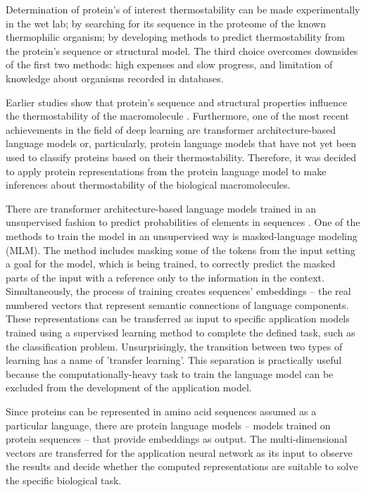 \documentclass[12pt]{article}
\begin{document}
	Determination of protein's of interest thermostability can be made 
	experimentally in the wet lab; by searching for its sequence in the 
	proteome of the known thermophilic organism; by developing methods to 
	predict thermostability from the protein's sequence or structural 
	model. The third choice overcomes downsides of the first two methods: 
	high expenses and slow progress, and limitation of knowledge about 
	organisms recorded in databases.

	Earlier studies show that protein's sequence and structural properties 
	influence the thermostability of the macromolecule 
	\cite{modarres2016protein}. Furthermore, one of the most recent 
	achievements in the field of deep learning are transformer 
	architecture-based language models or, particularly, protein language 
	models that have not yet been used to classify proteins based on
	their thermostability. Therefore, it was decided to apply protein 
	representations from the protein language model to make inferences about 
	thermostability of the biological macromolecules.

	There are transformer architecture-based language models trained in an 
	unsupervised fashion to predict probabilities of elements in sequences 
	\cite{devlin2018bert}. One of the methods to train the model in an 
	unsupervised way is masked-language modeling (MLM). The method includes 
	masking
	some of the tokens from the input setting a goal for the model, which is 
	being trained, to correctly predict the masked parts of the input with 
	a reference only to the information in the context.
	Simultaneously, the process of training creates sequences' embeddings – the 
	real numbered vectors that represent semantic connections of language 
	components. These representations can be transferred as input to specific 
	application models trained using a supervised learning method to complete 
	the defined task, such as the classification problem. Unsurprisingly, the 
	transition between two types of learning has a name of 'transfer learning'. 
	This separation is practically useful because the computationally-heavy 
	task to train the language model can be excluded from the development of 
	the application model.

	Since proteins can be represented in amino acid sequences assumed as a 
	particular language, there are protein language models – models trained on 
	protein sequences – that provide embeddings as output. The multi-dimensional 
	vectors are transferred for the application neural network as its input to 
	observe the results and decide whether the computed representations are 
	suitable to solve the specific biological task.
\end{document}
